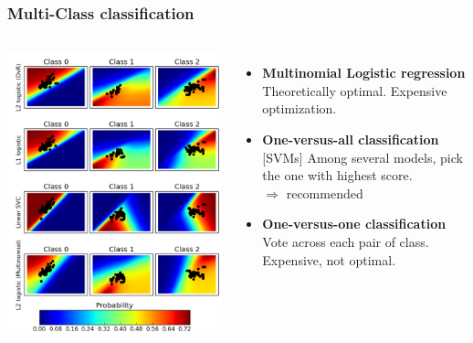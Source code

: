 \begin{frame}
\frametitle{Multi-Class classification}

\begin{columns}
\includegraphics[width=\textwidth]{sklearn_material/plot_classification_probability_001.png}
\begin{itemize}
\item {\bf Multinomial Logistic regression} Theoretically optimal. Expensive optimization. 
\item {\bf One-versus-all classification} [SVMs] Among several
  models, pick the one with highest score. \\$\Longrightarrow$
  recommended
\item {\bf One-versus-one classification} Vote across each pair of
  class. Expensive, not optimal.
\end{itemize}
\end{columns}
\end{frame}

